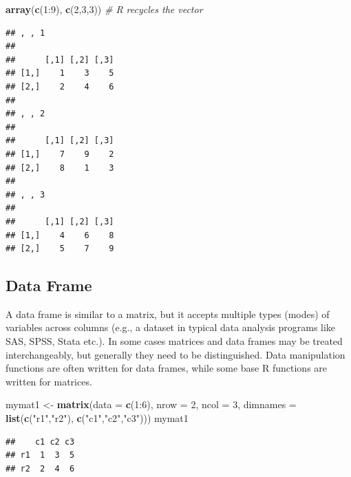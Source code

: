 \documentclass[]{book}
\newenvironment{Shaded}{\begin{snugshade}}{\end{snugshade}}
\newcommand{\KeywordTok}[1]{\textcolor[rgb]{0.13,0.29,0.53}{\textbf{{#1}}}}
\newcommand{\DataTypeTok}[1]{\textcolor[rgb]{0.13,0.29,0.53}{{#1}}}
\newcommand{\DecValTok}[1]{\textcolor[rgb]{0.00,0.00,0.81}{{#1}}}
\newcommand{\StringTok}[1]{\textcolor[rgb]{0.31,0.60,0.02}{{#1}}}
\newcommand{\CommentTok}[1]{\textcolor[rgb]{0.56,0.35,0.01}{\textit{{#1}}}}
\newcommand{\NormalTok}[1]{{#1}}
\theoremstyle{definition}
\theoremstyle{definition}
\theoremstyle{remark}
\begin{document}
\begin{Shaded}
\begin{Highlighting}[]
\KeywordTok{array}\NormalTok{(}\KeywordTok{c}\NormalTok{(}\DecValTok{1}\NormalTok{:}\DecValTok{9}\NormalTok{), }\KeywordTok{c}\NormalTok{(}\DecValTok{2}\NormalTok{,}\DecValTok{3}\NormalTok{,}\DecValTok{3}\NormalTok{))  }\CommentTok{# R recycles the vector }
\end{Highlighting}
\end{Shaded}

\begin{verbatim}
## , , 1
## 
##      [,1] [,2] [,3]
## [1,]    1    3    5
## [2,]    2    4    6
## 
## , , 2
## 
##      [,1] [,2] [,3]
## [1,]    7    9    2
## [2,]    8    1    3
## 
## , , 3
## 
##      [,1] [,2] [,3]
## [1,]    4    6    8
## [2,]    5    7    9
\end{verbatim}

\subsection{Data Frame}\label{data-frame}

A data frame is similar to a matrix, but it accepts multiple types
(modes) of variables across columns (e.g., a dataset in typical data
analysis programs like SAS, SPSS, Stata etc.). In some cases matrices
and data frames may be treated interchangeably, but generally they need
to be distinguished. Data manipulation functions are often written for
data frames, while some base R functions are written for matrices.

\begin{Shaded}
\begin{Highlighting}[]
\NormalTok{mymat1 <-}\StringTok{ }\KeywordTok{matrix}\NormalTok{(}\DataTypeTok{data =} \KeywordTok{c}\NormalTok{(}\DecValTok{1}\NormalTok{:}\DecValTok{6}\NormalTok{), }\DataTypeTok{nrow =} \DecValTok{2}\NormalTok{, }\DataTypeTok{ncol =} \DecValTok{3}\NormalTok{, }
       \DataTypeTok{dimnames =} \KeywordTok{list}\NormalTok{(}\KeywordTok{c}\NormalTok{(}\StringTok{"r1"}\NormalTok{,}\StringTok{"r2"}\NormalTok{), }\KeywordTok{c}\NormalTok{(}\StringTok{"c1"}\NormalTok{,}\StringTok{"c2"}\NormalTok{,}\StringTok{"c3"}\NormalTok{))) }
\NormalTok{mymat1}
\end{Highlighting}
\end{Shaded}

\begin{verbatim}
##    c1 c2 c3
## r1  1  3  5
## r2  2  4  6
\end{verbatim}
\end{document}
